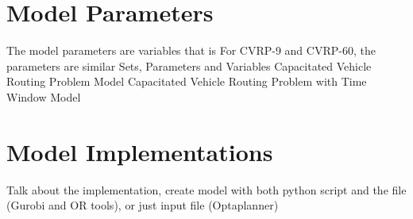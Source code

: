 \section{Model Parameters}
The model parameters are variables that is For CVRP-9 and CVRP-60, the parameters are similar
Sets, Parameters and Variables
Capacitated Vehicle Routing Problem Model
Capacitated Vehicle Routing Problem with Time Window Model

\section{Model Implementations}
Talk about the implementation, create model with both python script and the file (Gurobi and OR tools), or just
input file (Optaplanner)
